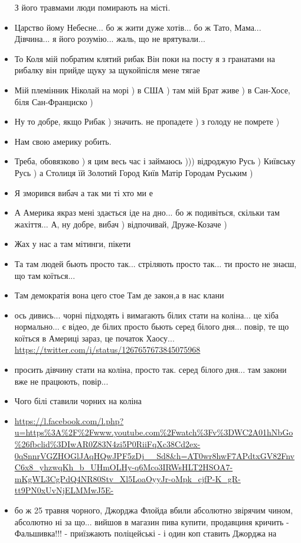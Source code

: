 \begin{itemize}
З його травмами люди помирають на місті.
\item Царство йому Небесне... бо ж жити дуже хотів... бо ж Тато, Мама...
Дівчина... я його розумію... жаль, що не врятували...
\item То Коля мій побратим клятий рибак
Він поки на посту я з гранатами на рибалку він прийде щуку за щукойпісля мене тягае
\item Мій племінник Ніколай на морі ) в США ) там мій Брат живе ) в Сан-Хосе, біля Сан-Франциско )
\item Ну то добре, якщо Рибак ) значить. не пропадете ) з голоду не помрете )
\item Нам свою америку робить.
\item Треба, обовязково ) я цим весь час і займаюсь )))
відроджую Русь ) Київську Русь ) а Столиця їй Золотий Город Київ Матір Городам Руським )
\item Я зморився вибач а так ми ті хто ми  е
\item А Америка якраз мені здається іде на дно... бо ж подивіться, скільки там жахіття...
А, ну добре, вибач ) відпочивай, Друже-Козаче )
\item Жах у нас а там мітинги, пікети
\item Та там людей бьють просто так... стріляють просто так... ти просто не знаєш, що там коїться...
\item Там демократія вона цего стое Там де закон,а в нас клани
\item ось дивись... чорні підходять і вимагають білих стати на коліна... це хіба нормально... є відео, де білих просто бьють серед білого дня... повір, те що коїться в Америці зараз, це початок Хаосу...
				\url{https://twitter.com/i/status/1267657673845075968}
\item просить дівчину стати на коліна, просто так. серед білого дня... там закони вже не працюють, повір...
\item Чого білі ставили чорних на коліна
\item \url{https://l.facebook.com/l.php?u=https%3A%2F%2Fwww.youtube.com%2Fwatch%3Fv%3DWC2A01hNbGo%26fbclid%3DIwAR0Z83N4zi5P0RiiFqXc38Cd2ex-0qSnnrVGZHOGlJAqHQwJPF5zDj__Sd8&h=AT0wr8hwF7APdtxGV82FnvC6x8_yhzwqKh_b_UHmOLHy-q6Mco3IRWsHLT2HSOA7-mKgWL3CgPdQ4NR80Stv_Xl5LoaOyyJr-oMpk_cjfP-K_gR-tt9PN0xUvNjELMMwJ5E-}
\item бо ж 25 травня чорного, Джорджа Флойда вбили абсолютно звірячим чином,
абсолютно ні за що... вийшов в магазин пива купити, продавциня кричить
- Фальшивка!!! - приїзжають поліцейські - і один коп ставить Джорджа на

\end{itemize}
